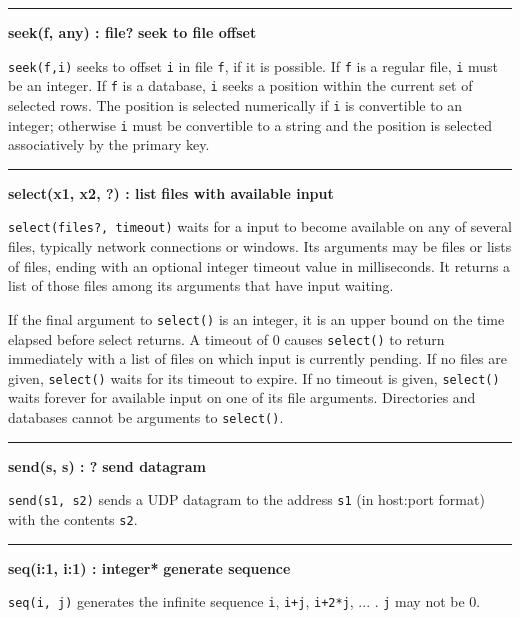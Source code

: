 \bigskip\hrule\vspace{0.1cm}
\noindent
{\bf seek(f, any) : file? } \hfill {\bf seek to file offset}

\noindent
{}\texttt{seek(f,i)} seeks to offset \texttt{i} in file
\texttt{f}, if it is possible. If \texttt{f} is a regular file,
\texttt{i} must be an integer. If \texttt{f} is a database, \texttt{i}
seeks a position within the current set of selected rows. The position
is selected numerically if \texttt{i} is convertible to an integer;
otherwise \texttt{i} must be convertible to a string and the position
is selected associatively by the primary key.

\bigskip\hrule\vspace{0.1cm}
\noindent
{\bf select(x1, x2, ?) : list } \hfill {\bf files with available input}

\noindent
\texttt{select(files?, timeout)} waits for a input to become available
on any of several files, typically network connections or windows. Its
arguments may be files or lists of files, ending with an optional
integer timeout value in milliseconds. It returns a list of those files
among its arguments that have input waiting.

If the final argument to \texttt{select()} is an
integer, it is an upper bound on the time elapsed before select
returns. A timeout of 0 causes \texttt{select()} to return immediately
with a list of files on which input is currently pending. If no files
are given, \texttt{select()} waits for its timeout to expire. If no
timeout is given, \texttt{select()} waits forever for available input
on one of its file arguments. Directories and databases cannot be
arguments to \texttt{select()}.

\bigskip\hrule\vspace{0.1cm}
\noindent
{\bf send(s, s) : ? } \hfill {\bf send datagram}

\noindent
{}\texttt{send(s1, s2)} sends a UDP datagram to the
address \texttt{s1} (in host:port format) with the contents
\texttt{s2}.

\bigskip\hrule\vspace{0.1cm}
\noindent
{\bf seq(i:1, i:1) : integer* } \hfill {\bf generate sequence}

\noindent
{}\texttt{seq(i, j)} generates the
infinite sequence \texttt{i}, \texttt{i+j}, \texttt{i+2*j}, ... .
\texttt{j} may not be 0.

